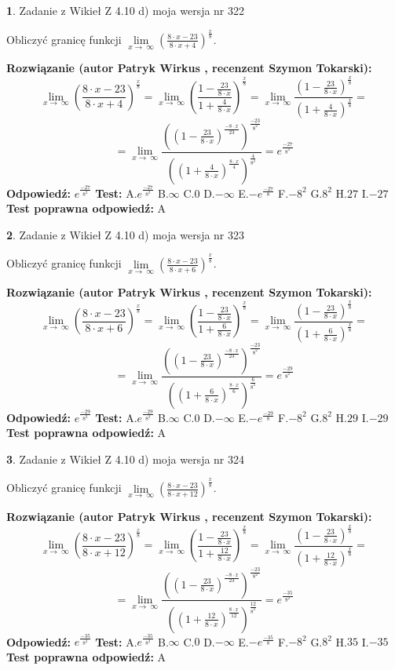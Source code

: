 \documentclass[12pt, a4paper]{article}
\theoremstyle{definition} %
\newtheorem{zad}{}
\newcommand{\zadStart}[1]{\begin{zad}#1\newline}
\newcommand{\zadStop}{\end{zad}}
\newcommand{\rozwStart}[2]{\noindent \textbf{Rozwiązanie (autor #1 , recenzent #2): }\newline}
\newcommand{\rozwStop}{\newline}
\newcommand{\odpStart}{\noindent \textbf{Odpowiedź:}\newline}
\newcommand{\odpStop}{\newline}
\newcommand{\testStart}{\noindent \textbf{Test:}\newline}
\newcommand{\testStop}{\newline}
\newcommand{\kluczStart}{\noindent \textbf{Test poprawna odpowiedź:}\newline}
\newcommand{\kluczStop}{\newline}
\begin{document}
\zadStart{Zadanie z Wikieł Z 4.10 d) moja wersja nr 322}


Obliczyć granicę funkcji  $\lim\limits_{x\to\ \infty}(\frac{8\cdot x-23}{8\cdot x+4})^{\frac{x}{8}}$.
\zadStop
\rozwStart{Patryk Wirkus}{Szymon Tokarski}
$$\lim\limits_{x\to\ \infty}(\frac{8\cdot x-23}{8\cdot x+4})^{\frac{x}{8}} = \lim\limits_{x\to\ \infty}(\frac{1-\frac{23}{8\cdot x}}{1+\frac{4}{8\cdot x}})^{\frac{x}{8}}=\lim\limits_{x\to\ \infty}\frac{(1-\frac{23}{8\cdot x})^{\frac{x}{8}}}{(1+\frac{4}{8\cdot x})^{\frac{x}{8}}}=$$
$$=\lim\limits_{x\to\ \infty}\frac{((1-\frac{23}{8\cdot x})^{\frac{-8\cdot x}{23}})^{\frac{-23}{8^{2}}}}{((1+\frac{4}{8\cdot x})^{\frac{8\cdot x}{4}})^{\frac{4}{8^{2}}}}=e^{\frac{-27}{8^{2}}}$$
\rozwStop
\odpStart
$e^{\frac{-27}{8^{2}}}$
\odpStop
\testStart
A.$e^{\frac{-27}{8^{2}}}$ B.$\infty$ C.$0$ D.$-\infty$ E.$-e^{\frac{-27}{8}}$
F.$-8^{2}$ G.$8^{2}$
H.$27$
I.$-27$
\testStop
\kluczStart
A
\kluczStop



\zadStart{Zadanie z Wikieł Z 4.10 d) moja wersja nr 323}


Obliczyć granicę funkcji  $\lim\limits_{x\to\ \infty}(\frac{8\cdot x-23}{8\cdot x+6})^{\frac{x}{8}}$.
\zadStop
\rozwStart{Patryk Wirkus}{Szymon Tokarski}
$$\lim\limits_{x\to\ \infty}(\frac{8\cdot x-23}{8\cdot x+6})^{\frac{x}{8}} = \lim\limits_{x\to\ \infty}(\frac{1-\frac{23}{8\cdot x}}{1+\frac{6}{8\cdot x}})^{\frac{x}{8}}=\lim\limits_{x\to\ \infty}\frac{(1-\frac{23}{8\cdot x})^{\frac{x}{8}}}{(1+\frac{6}{8\cdot x})^{\frac{x}{8}}}=$$
$$=\lim\limits_{x\to\ \infty}\frac{((1-\frac{23}{8\cdot x})^{\frac{-8\cdot x}{23}})^{\frac{-23}{8^{2}}}}{((1+\frac{6}{8\cdot x})^{\frac{8\cdot x}{6}})^{\frac{6}{8^{2}}}}=e^{\frac{-29}{8^{2}}}$$
\rozwStop
\odpStart
$e^{\frac{-29}{8^{2}}}$
\odpStop
\testStart
A.$e^{\frac{-29}{8^{2}}}$ B.$\infty$ C.$0$ D.$-\infty$ E.$-e^{\frac{-29}{8}}$
F.$-8^{2}$ G.$8^{2}$
H.$29$
I.$-29$
\testStop
\kluczStart
A
\kluczStop



\zadStart{Zadanie z Wikieł Z 4.10 d) moja wersja nr 324}


Obliczyć granicę funkcji  $\lim\limits_{x\to\ \infty}(\frac{8\cdot x-23}{8\cdot x+12})^{\frac{x}{8}}$.
\zadStop
\rozwStart{Patryk Wirkus}{Szymon Tokarski}
$$\lim\limits_{x\to\ \infty}(\frac{8\cdot x-23}{8\cdot x+12})^{\frac{x}{8}} = \lim\limits_{x\to\ \infty}(\frac{1-\frac{23}{8\cdot x}}{1+\frac{12}{8\cdot x}})^{\frac{x}{8}}=\lim\limits_{x\to\ \infty}\frac{(1-\frac{23}{8\cdot x})^{\frac{x}{8}}}{(1+\frac{12}{8\cdot x})^{\frac{x}{8}}}=$$
$$=\lim\limits_{x\to\ \infty}\frac{((1-\frac{23}{8\cdot x})^{\frac{-8\cdot x}{23}})^{\frac{-23}{8^{2}}}}{((1+\frac{12}{8\cdot x})^{\frac{8\cdot x}{12}})^{\frac{12}{8^{2}}}}=e^{\frac{-35}{8^{2}}}$$
\rozwStop
\odpStart
$e^{\frac{-35}{8^{2}}}$
\odpStop
\testStart
A.$e^{\frac{-35}{8^{2}}}$ B.$\infty$ C.$0$ D.$-\infty$ E.$-e^{\frac{-35}{8}}$
F.$-8^{2}$ G.$8^{2}$
H.$35$
I.$-35$
\testStop
\kluczStart
A
\kluczStop
\end{document}
